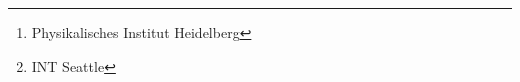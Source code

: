 \author{Sebastian Neubert\footnote[a]{Physikalisches Institut Heidelberg}, Martin Hoferichter\footnote[b]{INT Seattle}, Miriam Fritsch$^c$, Simon Eidelman$^{d,e}$, Michael Pennington$^f$, Bernhard Ketzer$^g$, Jonas Rademacker$^h$, Wolfgang Gradl$^j$, Christoph Hanhart$^k$, Bastian Kubis$^l$, José R. Peláez$^m$, Claudia Patrignani$n$}


